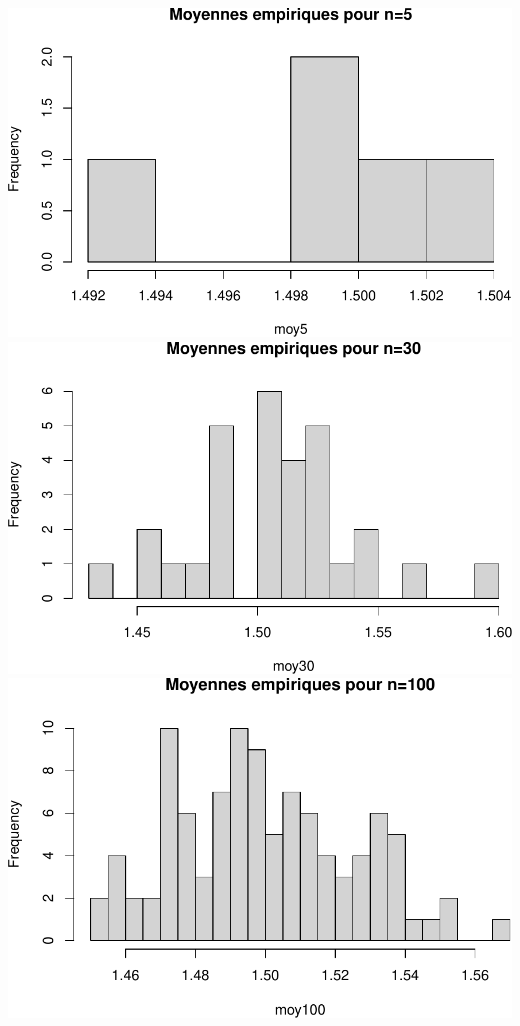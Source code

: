 \documentclass[
]{article}
\begin{document}
\includegraphics{tp2_files/figure-latex/echantillons-1.pdf}
\includegraphics{tp2_files/figure-latex/echantillons-2.pdf}
\includegraphics{tp2_files/figure-latex/echantillons-3.pdf}
\end{document}

